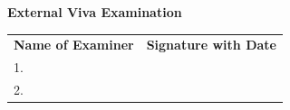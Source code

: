 \vspace{1.5cm}

\begin{center}
\textbf{External Viva Examination}
\end{center}
\vspace{0.4cm}

\noindent
\begin{tabularx}{\textwidth}{@{} p{} >{\centering\arraybackslash}X @{}}
\hspace{1.5cm}\textbf{Name of Examiner} & \textbf{Signature with Date} \\[0.5cm]
1. & \\[1cm]
2. & \\
\end{tabularx}